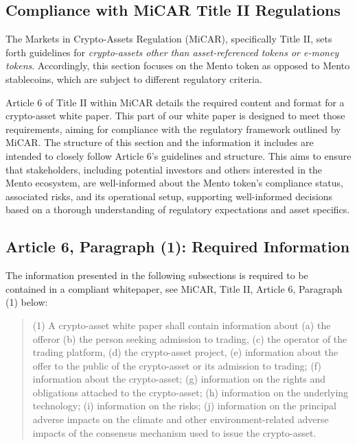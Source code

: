 \documentclass[a4paper]{article}
\theoremstyle{definition}
\begin{document}
\begin{appendices}

\section{Compliance with MiCAR Title II Regulations}
\label{sec:micar}
The Markets in Crypto-Assets Regulation (MiCAR), specifically Title II, sets forth guidelines for \textit{crypto-assets other than asset-referenced tokens or e-money tokens}. Accordingly, this section focuses on the Mento token as opposed to Mento stablecoins, which are subject to different regulatory criteria.

Article 6 of Title II within MiCAR details the required content and format for a crypto-asset white paper. This part of our white paper is designed to meet those requirements, aiming for compliance with the regulatory framework outlined by MiCAR. The structure of this section and the information it includes are intended to closely follow Article 6's guidelines and structure. This aims to ensure that stakeholders, including potential investors and others interested in the Mento ecosystem, are well-informed about the Mento token's compliance status, associated risks, and its operational setup, supporting well-informed decisions based on a thorough understanding of regulatory expectations and asset specifics.

\subsection{Article 6, Paragraph (1): Required Information}
The information presented in the following subsections is required to be contained in a compliant whitepaper, see MiCAR, Title II, Article 6, Paragraph (1) below:

\begin{quote}
(1) A crypto-asset white paper shall contain information about (a) the offeror (b) the person seeking admission to trading, (c) the operator of the trading platform, (d) the crypto-asset project, (e) information about the offer to the public of the crypto-asset or its admission to trading; (f) information about the crypto-asset; (g) information on the rights and obligations attached to the crypto-asset; (h) information on the underlying technology; (i) information on the risks; (j) information on the principal adverse impacts on the climate and other environment-related adverse impacts of the consensus mechanism used to issue the crypto-asset.
\end{quote}


\end{appendices}
\end{document}
